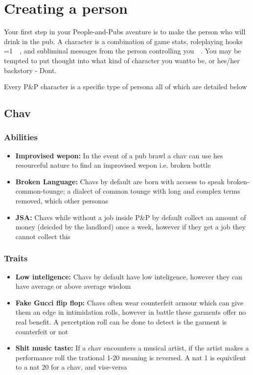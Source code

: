 \documentclass{book}
\begin{document}
\section{Creating a person}
Your first step in your People-and-Pubs aventure is to make the person who will drink in the pub. A character is a combination of game stats, roleplaying hooks =1~~, and subliminal messages from the person controlling you~~. You may be tempted to put thought into what kind of character you wantto be, or hes/her backstory - Dont.

Every P\&P character is a specific type of persona all of which are detailed below

\subsection{Chav}
\subsubsection{Abilities}
\begin{itemize}
    \item \textbf{Improvised wepon:} In the event of a pub brawl a chav can use hes resourceful nature to find an improvised wepon i.e. broken bottle
    \item \textbf{Broken Language:} Chavs by default are born with accsess to speak broken-common-tounge; a dialect of common tounge with long and complex terms removed, which other personas 
    \item \textbf{JSA:} Chavs while without a job inside P\&P by default collect an amount of money (deicded by the landlord) once a week, however if they get a job they cannot collect this
\end{itemize}
\subsubsection{Traits}
\begin{itemize}
    \item \textbf{Low inteligence:} Chavs by default have low inteligence, however they can have average or above average wisdom
    \item \textbf{Fake Gucci flip flop:} Chavs often wear counterfeit armour which can give them an edge in intimidation rolls, however in battle these garments offer no real benefit. A percetption roll can be done to detect is the garment is counterfeit or not
    \item \textbf{Shit music taste:} If a chav encounters a musical artist, if the artist makes a performance roll the trational 1-20 meaning is reversed. A nat 1 is equivilent to a nat 20 for a chav, and vise-versa
\end{itemize}
\end{document}
